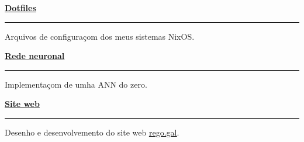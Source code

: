 \documentclass [10pt, a4paper] {extarticle}
\newcommand{\rightcolumwidth}{ 0.84 }
\begin{document}
\begin {flushright}
\begin {minipage} [t] {\rightcolumwidth\textwidth}
    \begin {minipage} [t] {0.3\textwidth}
      \begin{minipage}[c]{100pt}
        \href {https://github.com/yref-boop/dotfiles} {\textbf {Dotfiles}}
      \end{minipage}
      \hfill
      \begin{minipage}[c]{8pt}
      \end{minipage}
      \vspace{1px}
      \hrule
      \vspace {4px} Arquivos de configuraçom dos meus sistemas NixOS.
    \end {minipage}
    \hfill
    \begin {minipage} [t] {0.3\textwidth}
      \begin{minipage}[c]{100pt}
        \href {https://github.com/yref-boop/ann} {\textbf {Rede neuronal}}
      \end{minipage}
      \hfill
      \begin{minipage}[c]{9pt}
      \vspace{1px}
      \end{minipage}
      \vspace{1px}
      \hrule
      \vspace {4px} Implementaçom de umha ANN do zero.
    \end {minipage}
    \hfill
    \begin {minipage} [t] {0.3\textwidth}
      \begin{minipage}[c]{100pt}
        \href {https://github.com/yref-boop/rego} {\textbf {Site web}}
      \end{minipage}
      \hfill
      \begin{minipage}[c]{8pt}
      \vspace{1px}
      \end{minipage}
      \vspace{1px}
      \hrule
      \vspace {4px} Desenho e desenvolvemento do site web \href{http://rego.gal}{\underline{rego.gal}}.
    \end {minipage}

  \end {minipage}
  \end {flushright}
\end{document}
